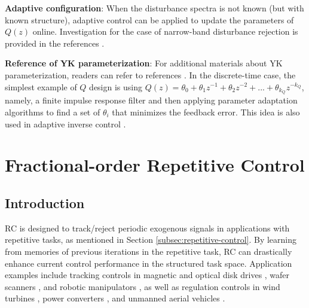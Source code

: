 \documentclass [11pt, proquest] {uwthesis}[2020/02/24]
\begin{document}
\textbf{Adaptive configuration}: When the disturbance spectra is not
known (but with known structure), adaptive control can be applied
to update the parameters of $Q(z)$ online. Investigation for the
case of narrow-band disturbance rejection is provided in the references
\cite{XuChen_TCST2012,chen2010unknown}.

\textbf{Reference of YK parameterization}: For additional materials
about YK parameterization, readers can refer to references \cite{landau2005adaptive,doyle2013feedback,ANDERSON19981485}.
In the discrete-time case, the simplest example of $Q$ design is
using $Q(z)=\theta_{0}+\theta_{1}z^{-1}+\theta_{2}z^{-2}+...+\theta_{k_{Q}}z^{-k_{Q}}$,
namely, a finite impulse response filter and then applying parameter
adaptation algorithms to find a set of $\theta_{i}$ that minimizes
the feedback error. This idea is also used in adaptive inverse control
\cite{Widrow2007}.


\chapter{Fractional-order Repetitive Control} \label{chap:Fractional-RC}

\section{Introduction} \label{sec:Fractional-RC-Introduction}

RC \cite{inoue1981highpower} is designed to
track/reject periodic exogenous signals in applications with repetitive
tasks, as mentioned in Section \ref{subsec:repetitive-control}. By learning from memories of previous iterations in the repetitive
task, RC can drastically enhance current control performance in the
structured task space. Application examples include tracking controls
in magnetic and optical disk drives \cite{chew1989digital,doh2006design},
wafer scanners \cite{XuChen_TCST_RC2013}, and robotic manipulators
\cite{cosner1990plug,meng2017robust}, as well as regulation controls
in wind turbines \cite{navalkar2014subspace,castro2017variable},
power converters \cite{nazir2015analysis}, and unmanned aerial vehicles
\cite{he2017repetitive}.
\end{document}
